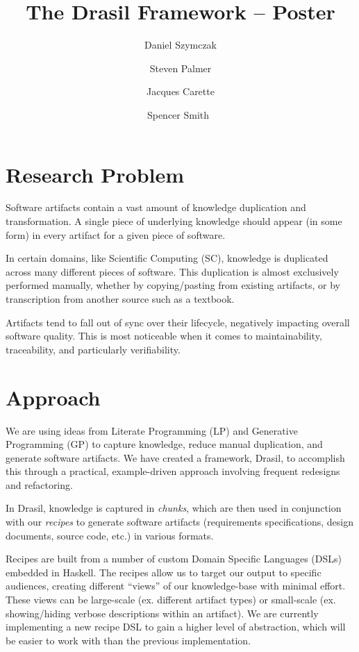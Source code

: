 \documentclass[twocolumn, 10pt]{article} %
\title{The Drasil Framework -- Poster}
\author{
  Daniel Szymczak
  \and
  Steven Palmer
  \and
  Jacques Carette
  \and
  Spencer Smith\
}
\begin{document}
\maketitle

\section{Research Problem}

Software artifacts contain a vast amount of knowledge duplication and
transformation. A single piece of underlying knowledge should appear (in some
form) in every artifact for a given piece of software.

In certain domains,
like Scientific Computing (SC),
knowledge is duplicated across many different pieces of software. This
duplication is almost exclusively performed manually, whether by copying/pasting
from existing artifacts, or by transcription from another source such as a textbook.

Artifacts tend to fall out of sync over their lifecycle,
negatively impacting overall software quality. This is most noticeable 
when it comes to maintainability, traceability, and particularly verifiability.

\section{Approach}

We are using ideas from Literate Programming (LP) and Generative Programming
(GP) to capture knowledge, reduce manual duplication, and generate software
artifacts. We have created a framework, Drasil, to accomplish this through a
practical, example-driven approach involving frequent redesigns and refactoring.

In Drasil, knowledge is captured in \textit{chunks}, which are then used in
conjunction with our \textit{recipes} to generate software artifacts (requirements
specifications, design documents, source code, etc.) in various formats.

Recipes are built from a number of custom Domain Specific Languages (DSLs)
embedded in Haskell. The recipes allow us to target our output to specific
audiences, creating different ``views'' of our knowledge-base with minimal
effort. These views can be large-scale (ex. different artifact types) or
small-scale (ex. showing/hiding verbose descriptions within an artifact). We are
currently implementing a new recipe DSL to gain a higher level of abstraction,
which will be easier to work with than the previous implementation.
\end{document}
